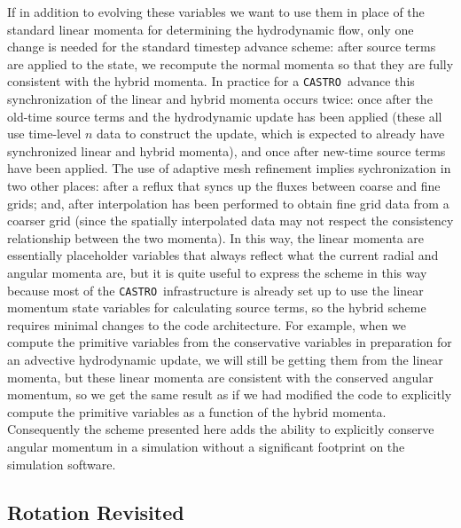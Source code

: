 \documentclass[twocolumn,numberedappendix]{../aastex60}
\newcommand{\castro}{\texttt{CASTRO}}
\begin{document}
If in addition to evolving these variables we want to use them in place of the
standard linear momenta for determining the hydrodynamic flow, only one change
is needed for the standard timestep advance scheme: after source terms are
applied to the state, we recompute the normal momenta so that they are fully
consistent with the hybrid momenta. In practice for a \castro\ advance this
synchronization of the linear and hybrid momenta occurs twice: once after the
old-time source terms and the hydrodynamic update has been applied (these all
use time-level $n$ data to construct the update, which is expected to already have
synchronized linear and hybrid momenta), and once after new-time source
terms have been applied. The use of adaptive mesh refinement implies sychronization
in two other places: after a reflux that syncs up the fluxes between coarse and
fine grids; and, after interpolation has been performed to obtain fine grid data
from a coarser grid (since the spatially interpolated data may not respect the
consistency relationship between the two momenta). In this way, the linear momenta
are essentially placeholder variables that always reflect what the current radial
and angular momenta are, but it is quite useful to express the scheme in this way
because most of the \castro\ infrastructure is already set up to use the linear
momentum state variables for calculating source terms, so the hybrid scheme requires
minimal changes to the code architecture. For example, when we compute
the primitive variables from the conservative variables in preparation for an advective
hydrodynamic update, we will still be getting them from the linear momenta,
but these linear momenta are consistent with the conserved angular momentum,
so we get the same result as if we had modified the code to explicitly compute
the primitive variables as a function of the hybrid momenta. Consequently the
scheme presented here adds the ability to explicitly conserve angular momentum
in a simulation without a significant footprint on the simulation software.



\subsection{Rotation Revisited}\label{sec:rotation}
\end{document}
